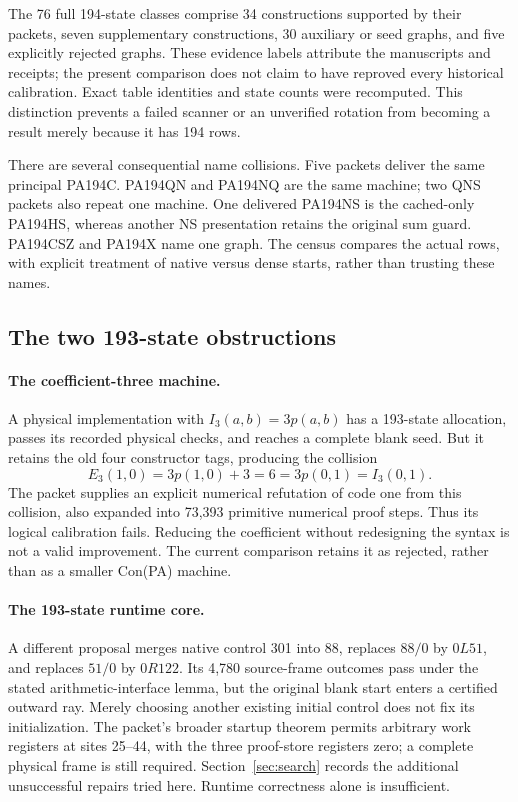 \documentclass[11pt,letterpaper]{article}
\begin{document}
The 76 full 194-state classes comprise 34 constructions supported by their
packets, seven supplementary constructions, 30 auxiliary or seed graphs,
and five explicitly rejected graphs. These evidence labels attribute the
manuscripts and receipts; the present comparison does not claim to have
reproved every historical calibration. Exact table identities and state
counts were recomputed. This distinction prevents a failed scanner or an
unverified rotation from becoming a result merely because it has 194 rows.

There are several consequential name collisions. Five packets deliver the
same principal PA194C. PA194QN and PA194NQ are the same machine; two QNS
packets also repeat one machine. One delivered PA194NS is the cached-only
PA194HS, whereas another NS presentation retains the original sum guard.
PA194CSZ and PA194X name one graph. The census compares the actual rows,
with explicit treatment of native versus dense starts, rather than trusting
these names.

\subsection{The two 193-state obstructions}

\paragraph{The coefficient-three machine.}
A physical implementation with $I_3(a,b)=3p(a,b)$ has a 193-state allocation,
passes its recorded physical checks, and reaches a complete blank seed.
But it retains the old four constructor tags, producing the collision
\[
 E_3(1,0)=3p(1,0)+3=6=3p(0,1)=I_3(0,1).
\]
The packet supplies an explicit numerical refutation of code one from this
collision, also expanded into 73,393 primitive numerical proof steps. Thus its
logical calibration fails. Reducing the coefficient without redesigning
the syntax is not a valid improvement. The current comparison retains it
as rejected, rather than as a smaller Con(PA) machine.

\paragraph{The 193-state runtime core.}
A different proposal merges native control 301 into 88, replaces
$88/0$ by $0L51$, and replaces $51/0$ by $0R122$. Its 4,780 source-frame
outcomes pass under the stated arithmetic-interface lemma, but the original
blank start enters a certified outward ray. Merely choosing another
existing initial control does not fix its initialization. The packet's
broader startup theorem permits arbitrary work registers at sites 25--44,
with the three proof-store registers zero; a complete physical frame is
still required. Section~\ref{sec:search} records the additional unsuccessful
repairs tried here. Runtime correctness alone is insufficient.
\end{document}
